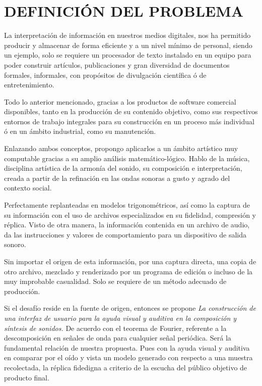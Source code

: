 \documentclass{book}
\begin{document}
	\pagebreak\section*{DEFINICIÓN DEL PROBLEMA}
	La interpretación de información en nuestros medios digitales, nos ha permitido producir y almacenar de forma eficiente y a un nivel mínimo de personal, siendo un ejemplo, solo se requiere un procesador de texto instalado en un equipo para poder construir artículos, publicaciones y gran diversidad de documentos formales, informales, con propósitos de divulgación científica ó de entretenimiento.\par
	Todo lo anterior mencionado, gracias a los productos de software comercial disponibles, tanto en la producción de su contenido objetivo, como sus respectivos entornos de trabajo integrales para su construcción en un proceso más individual ó en un ámbito industrial, como su manutención.\par
	Enlazando ambos conceptos, propongo aplicarlos a un ámbito artístico muy computable gracias a su amplio análisis matemático-lógico. Hablo de la música, disciplina artística de la armonía del sonido, su composición e interpretación, creada a partir de la refinación en las ondas sonoras a gusto y agrado del contexto social.\par 
	Perfectamente replanteadas en modelos trigonométricos, así como la captura de su información con el uso de archivos especializados en su fidelidad, compresión y réplica.
	Visto de otra manera, la información contenida en un archivo de audio, da las instrucciones y valores de comportamiento para un dispositivo de salida sonoro.\par 
	\pagebreak Sin importar el origen de esta información, por una captura directa, una copia de otro archivo, mezclado y renderizado por un programa de edición o incluso de la muy improbable casualidad. Solo se requiere de un método adecuado de producción.\par
	Si el desafío reside en la fuente de origen, entonces se propone \emph{La construcción de una interfaz de usuario para la ayuda visual y auditiva en la composición y síntesis de sonidos.}
	De acuerdo con el teorema de Fourier, referente a la descomposición en señales de onda para cualquier señal periódica. Será la fundamental relación de nuestra propuesta. Pues con la ayuda visual y auditiva en comparar por el oído y vista un modelo generado con respecto a una muestra recolectada, la réplica fidedigna a criterio de la escucha del público objetivo de producto final.\par 
\end{document}
